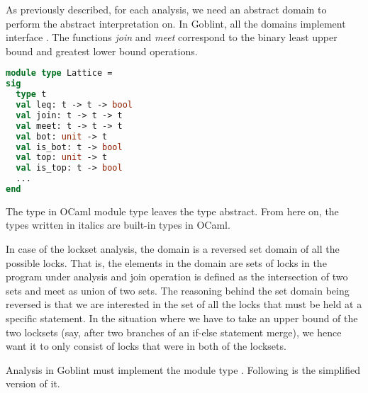 \documentclass[..thesis.tex]{subfiles}
\begin{document}

As previously described, for each analysis, we need an abstract domain to perform the abstract interpretation on. In Goblint, all the domains implement interface . The functions \textit{join} and \textit{meet} correspond to the binary least upper bound and greatest lower bound operations. 


\begin{lstlisting}[language=Caml,style=caml]
module type Lattice =
sig
  type t
  val leq: t -> t -> bool
  val join: t -> t -> t
  val meet: t -> t -> t
  val bot: unit -> t
  val is_bot: t -> bool
  val top: unit -> t
  val is_top: t -> bool
  ...
end
\end{lstlisting}

The type  in OCaml module type leaves the type abstract. From here on, the types written in italics are built-in types in OCaml. 



In case of the lockset analysis, the domain is a reversed set domain of all the possible locks. That is, the elements in the domain are sets of locks in the program under analysis and join operation is defined as the intersection of two sets and meet as union of two sets. The reasoning behind the set domain being reversed is that we are interested in the set of all the locks that must be held at a specific statement. In the situation where we have to take an upper bound of the two locksets (say, after two branches of an if-else statement merge), we hence want it to only consist of locks that were in both of the locksets.

Analysis in Goblint must implement the module type . Following is the simplified version of it.

\end{document}
